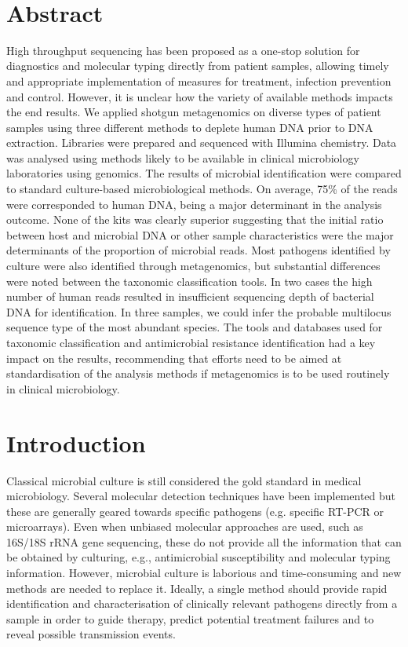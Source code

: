 \mbox{}\\
\vspace{8cm}

\section{Abstract} \label{sec:abstract}

High throughput sequencing has been proposed as a one-stop solution for diagnostics and molecular typing directly from patient samples, allowing timely and appropriate implementation of measures for treatment, infection prevention and control. 
However, it is unclear how the variety of available methods impacts the end results. 
We applied shotgun metagenomics on diverse types of patient samples using three different methods to deplete human DNA prior to DNA extraction.
Libraries were prepared and sequenced with Illumina chemistry. 
Data was analysed using methods likely to be available in clinical microbiology laboratories using genomics. 
The results of microbial identification were compared to standard culture-based microbiological methods. 
On average, 75\% of the reads were corresponded to human DNA, being a major determinant in the analysis outcome. 
None of the kits was clearly superior suggesting that the initial ratio between host and microbial DNA or other sample characteristics were the major determinants of the proportion of microbial reads. 
Most pathogens identified by culture were also identified through metagenomics, but substantial differences were noted between the taxonomic classification tools. 
In two cases the high number of human reads resulted in insufficient sequencing depth of bacterial DNA for identification. 
In three samples, we could infer the probable multilocus sequence type of the most abundant species. 
The tools and databases used for taxonomic classification and antimicrobial resistance identification had a key impact on the results, recommending that efforts need to be aimed at standardisation of the analysis methods if metagenomics is to be used routinely in clinical microbiology.

\section{Introduction} \label{sec:introduction}

Classical microbial culture is still considered the gold standard in medical microbiology. 
Several molecular detection techniques have been implemented but these are generally geared towards specific pathogens (e.g. specific RT-PCR or microarrays). 
Even when unbiased molecular approaches are used, such as 16S/18S rRNA gene sequencing, these do not provide all the information that can be obtained by culturing, e.g., antimicrobial susceptibility and molecular typing information. 
However, microbial culture is laborious and time-consuming and new methods are needed to replace it. 
Ideally, a single method should provide rapid identification and characterisation of clinically relevant pathogens directly from a sample in order to guide therapy, predict potential treatment failures and to reveal possible transmission events.

